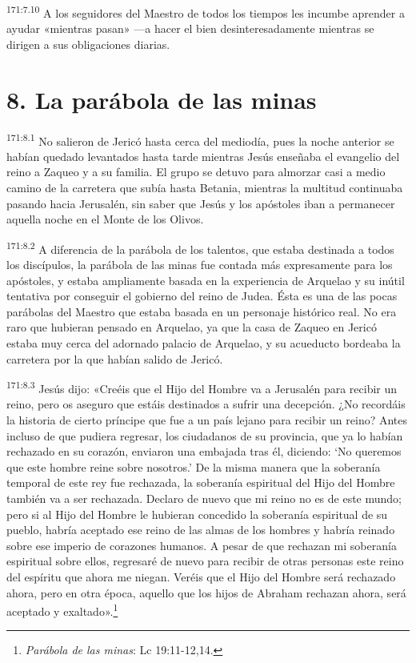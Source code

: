 \par
\textsuperscript{171:7.10} A los seguidores del Maestro de todos los tiempos les incumbe aprender a ayudar «mientras pasan» ---a hacer el bien desinteresadamente mientras se dirigen a sus obligaciones diarias.

\section*{8. La parábola de las minas}
\par
\textsuperscript{171:8.1} No salieron de Jericó hasta cerca del mediodía, pues la noche anterior se habían quedado levantados hasta tarde mientras Jesús enseñaba el evangelio del reino a Zaqueo y a su familia. El grupo se detuvo para almorzar casi a medio camino de la carretera que subía hasta Betania, mientras la multitud continuaba pasando hacia Jerusalén, sin saber que Jesús y los apóstoles iban a permanecer aquella noche en el Monte de los Olivos.

\par
\textsuperscript{171:8.2} A diferencia de la parábola de los talentos, que estaba destinada a todos los discípulos, la parábola de las minas fue contada más expresamente para los apóstoles, y estaba ampliamente basada en la experiencia de Arquelao y su inútil tentativa por conseguir el gobierno del reino de Judea. Ésta es una de las pocas parábolas del Maestro que estaba basada en un personaje histórico real. No era raro que hubieran pensado en Arquelao, ya que la casa de Zaqueo en Jericó estaba muy cerca del adornado palacio de Arquelao, y su acueducto bordeaba la carretera por la que habían salido de Jericó.

\par
\textsuperscript{171:8.3} Jesús dijo: «Creéis que el Hijo del Hombre va a Jerusalén para recibir un reino, pero os aseguro que estáis destinados a sufrir una decepción. ¿No recordáis la historia de cierto príncipe que fue a un país lejano para recibir un reino? Antes incluso de que pudiera regresar, los ciudadanos de su provincia, que ya lo habían rechazado en su corazón, enviaron una embajada tras él, diciendo: `No queremos que este hombre reine sobre nosotros.' De la misma manera que la soberanía temporal de este rey fue rechazada, la soberanía espiritual del Hijo del Hombre también va a ser rechazada. Declaro de nuevo que mi reino no es de este mundo; pero si al Hijo del Hombre le hubieran concedido la soberanía espiritual de su pueblo, habría aceptado ese reino de las almas de los hombres y habría reinado sobre ese imperio de corazones humanos. A pesar de que rechazan mi soberanía espiritual sobre ellos, regresaré de nuevo para recibir de otras personas este reino del espíritu que ahora me niegan. Veréis que el Hijo del Hombre será rechazado ahora, pero en otra época, aquello que los hijos de Abraham rechazan ahora, será aceptado y exaltado».\footnote{\textit{Parábola de las minas}: Lc 19:11-12,14.}

